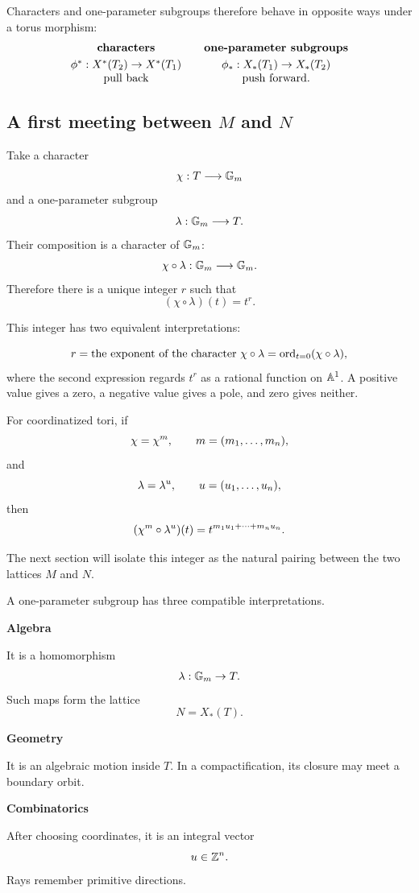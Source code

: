 Characters and one-parameter subgroups therefore behave in opposite
ways under a torus morphism:
\[
\begin{array}{c@{\qquad}c}
\textbf{characters}
&
\textbf{one-parameter subgroups}
\\[1mm]
\phi^*:X^*(T_2)\to X^*(T_1)
&
\phi_*:X_*(T_1)\to X_*(T_2)
\\
\text{pull back}
&
\text{push forward}.
\end{array}
\]

\subsection{A first meeting between
\texorpdfstring{\(M\)}{M} and \texorpdfstring{\(N\)}{N}}

Take a character
\[
\chi:T\longrightarrow\mathbb{G}_{m}
\]
and a one-parameter subgroup
\[
\lambda:\mathbb{G}_{m}\longrightarrow T.
\]
Their composition is a character of \(\mathbb{G}_{m}\):
\[
\chi\circ\lambda:\mathbb{G}_{m}\longrightarrow\mathbb{G}_{m}.
\]
Therefore there is a unique integer \(r\) such that
\[
(\chi\circ\lambda)(t)=t^r.
\]

This integer has two equivalent interpretations:

\[
r
=
\text{the exponent of the character }\chi\circ\lambda
=
\operatorname{ord}_{t=0}(\chi\circ\lambda),
\]
where the second expression regards \(t^r\) as a rational function on
\(\mathbb{A}^1\). A positive value gives a zero, a negative value gives a
pole, and zero gives neither.

For coordinatized tori, if
\[
\chi=\chi^{m},
\qquad
m=(m_1,\ldots,m_n),
\]
and
\[
\lambda=\lambda^{u},
\qquad
u=(u_1,\ldots,u_n),
\]
then
\[
(\chi^{m}\circ\lambda^{u})(t)
=
t^{m_1u_1+\cdots+m_nu_n}.
\]

The next section will isolate this integer as the natural pairing
between the two lattices \(M\) and \(N\).

\begin{threedictionaries}
A one-parameter subgroup has three compatible interpretations.

\medskip

\noindent
\begin{minipage}[t]{0.30\linewidth}
\centering
\textbf{Algebra}\par
\smallskip
It is a homomorphism
\[
\lambda:\mathbb{G}_{m}\to T.
\]
Such maps form the lattice
\[
N=X_*(T).
\]
\end{minipage}
\hfill
\begin{minipage}[t]{0.30\linewidth}
\centering
\textbf{Geometry}\par
\smallskip
It is an algebraic motion inside \(T\). In a compactification, its
closure may meet a boundary orbit.
\end{minipage}
\hfill
\begin{minipage}[t]{0.30\linewidth}
\centering
\textbf{Combinatorics}\par
\smallskip
After choosing coordinates, it is an integral vector
\[
u\in\mathbb{Z}^n.
\]
Rays remember primitive directions.
\end{minipage}
\end{threedictionaries}

